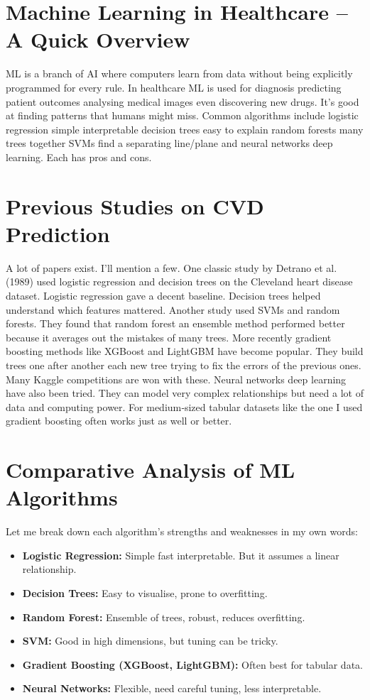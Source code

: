 \documentclass[11pt, a4paper, oneside]{book}
\begin{document}
\section{Machine Learning in Healthcare – A Quick Overview}
ML is a branch of AI where computers learn from data without being explicitly programmed for every rule. In healthcare ML is used for diagnosis predicting patient outcomes analysing medical images even discovering new drugs. It's good at finding patterns that humans might miss. Common algorithms include logistic regression simple interpretable decision trees easy to explain random forests many trees together SVMs find a separating line/plane and neural networks deep learning. Each has pros and cons.

\section{Previous Studies on CVD Prediction}
A lot of papers exist. I'll mention a few.
One classic study by Detrano et al. (1989) used logistic regression and decision trees on the Cleveland heart disease dataset. Logistic regression gave a decent baseline. Decision trees helped understand which features mattered.
Another study used SVMs and random forests. They found that random forest an ensemble method performed better because it averages out the mistakes of many trees.
More recently gradient boosting methods like XGBoost and LightGBM have become popular. They build trees one after another each new tree trying to fix the errors of the previous ones. Many Kaggle competitions are won with these.
Neural networks deep learning have also been tried. They can model very complex relationships but need a lot of data and computing power. For medium‑sized tabular datasets like the one I used gradient boosting often works just as well or better.

\section{Comparative Analysis of ML Algorithms}
Let me break down each algorithm's strengths and weaknesses in my own words:
\begin{itemize}
\item \textbf{Logistic Regression:} Simple fast interpretable. But it assumes a linear relationship.
\item \textbf{Decision Trees:} Easy to visualise, prone to overfitting.
\item \textbf{Random Forest:} Ensemble of trees, robust, reduces overfitting.
\item \textbf{SVM:} Good in high dimensions, but tuning can be tricky.
\item \textbf{Gradient Boosting (XGBoost, LightGBM):} Often best for tabular data.
\item \textbf{Neural Networks:} Flexible, need careful tuning, less interpretable.
\end{itemize}
\end{document}
